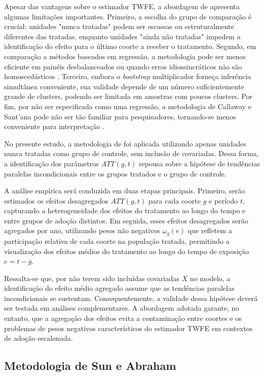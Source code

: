 \documentclass[12pt,a4paper,oneside]{article}
\begin{document}
Apesar das vantagens sobre o estimador TWFE, a abordagem de \citet{Callaway2021} apresenta algumas limitações importantes. Primeiro, a escolha do grupo de comparação é crucial: unidades "nunca tratadas" podem ser escassas ou estruturalmente diferentes das tratadas, enquanto unidades "ainda não tratadas" impedem a identificação do efeito para o último coorte a receber o tratamento.  Segundo, em comparação a métodos baseados em regressão, a metodologia pode ser menos eficiente em painéis desbalanceados ou quando erros idiossincráticos não são homoscedásticos \citep{Wooldridge2025}. Terceiro, embora o \textit{bootstrap} multiplicador forneça inferência simultânea conveniente, sua validade depende de um número suficientemente grande de clusters, podendo ser limitada em amostras com poucos clusters. Por fim, por não ser especificada como uma regressão, a metodologia de Callaway e Sant'ana pode não ser tão familiar para pesquisadores, tornando-se menos conveniente para interpretação \citep{Sun2021}.

No presente estudo, a metodologia de \citet{Callaway2021} foi aplicada utilizando apenas unidades nunca tratadas como grupo de controle, sem inclusão de covariadas. Dessa forma, a identificação dos parâmetros \(ATT(g,t)\) repousa sobre a hipótese de tendências paralelas incondicionais entre os grupos tratados e o grupo de controle.  

A análise empírica será conduzida em duas etapas principais. Primeiro, serão estimados os efeitos desagregados \(ATT(g,t)\) para cada coorte \(g\) e período \(t\), capturando a heterogeneidade dos efeitos do tratamento ao longo do tempo e entre grupos de adoção distintos. Em seguida, esses efeitos desagregados serão agregados por ano, utilizando pesos não negativos \(\omega_g(e)\) que refletem a participação relativa de cada coorte na população tratada, permitindo a visualização dos efeitos médios do tratamento ao longo do tempo de exposição \(e = t-g\).  

Ressalta-se que, por não terem sido incluídas covariadas \(X\) no modelo, a identificação do efeito médio agregado assume que as tendências paralelas incondicionais se sustentam. Consequentemente, a validade dessa hipótese deverá ser testada em análises complementares. A abordagem adotada garante, no entanto, que a agregação dos efeitos evita a contaminação entre coortes e os problemas de pesos negativos característicos do estimador TWFE em contextos de adoção escalonada.

		
		\subsection{Metodologia de Sun e Abraham}
		
\end{document}
